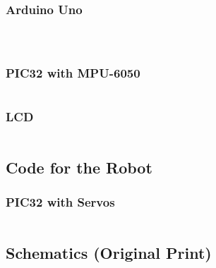 \documentclass[a4paper]{article}
\begin{document}
\subsubsection*{Arduino Uno}
\inputminted[frame=single,bgcolor=bg,breaklines,breakanywhere]{arduino}{"main.ino"}
\inputminted[frame=single,bgcolor=bg,breaklines,breakanywhere]{c}{"MPU6050.h"}
\inputminted[frame=single,bgcolor=bg,breaklines,breakanywhere]{c}{"MPU6050.cpp"}
\subsubsection*{PIC32 with MPU-6050}
\inputminted[frame=single,bgcolor=bg,breaklines,breakanywhere]{c}{"main.c"}
\subsubsection*{LCD}
\inputminted[frame=single,bgcolor=bg,breaklines,breakanywhere]{c}{"LCD.h"}
\subsection*{Code for the Robot}
\subsubsection*{PIC32 with Servos}
\inputminted[frame=single,bgcolor=bg,breaklines,breakanywhere]{c}{"servo.c"}
\subsection*{Schematics (Original Print)}

\end{document}
